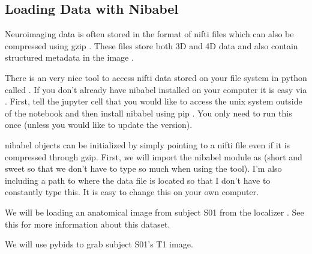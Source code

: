 \documentclass[letterpaper,10pt,english]{sphinxmanual}
\begin{document}
\subsection{Loading Data with Nibabel}
\label{\detokenize{content/Introduction_to_Neuroimaging_Data:loading-data-with-nibabel}}
Neuroimaging data is often stored in the format of nifti files  which can also be compressed using gzip .  These files store both 3D and 4D data and also contain structured metadata in the image .

There is an very nice tool to access nifti data stored on your file system in python called .  If you don’t already have nibabel installed on your computer it is easy via . First, tell the jupyter cell that you would like to access the unix system outside of the notebook and then install nibabel using pip . You only need to run this once (unless you would like to update the version).

nibabel objects can be initialized by simply pointing to a nifti file even if it is compressed through gzip.  First, we will import the nibabel module as  (short and sweet so that we don’t have to type so much when using the tool).  I’m also including a path to where the data file is located so that I don’t have to constantly type this.  It is easy to change this on your own computer.

We will be loading an anatomical image from subject S01 from the localizer .  See this  for more information about this dataset.

We will use pybids to grab subject S01’s T1 image.

\begin{sphinxVerbatim}[commandchars=\\\{\}]
   

      \PYG{p}{[}\PYG{p}{]}
\end{sphinxVerbatim}
\end{document}
